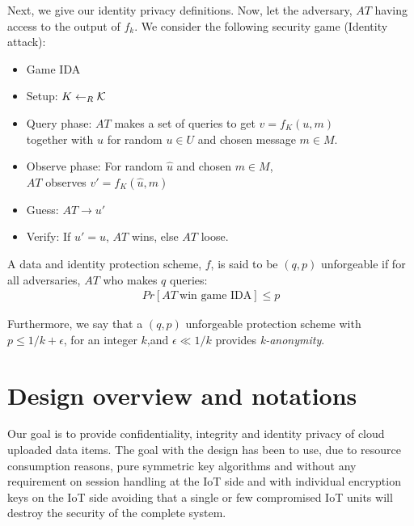 {\begin{definition}
\end{definition}
Next, we give our identity privacy definitions. Now, let the adversary, $AT$ having access to the output of $f_{k}$. We consider the following security game (Identity attack):
\begin{itemize}
    \item[] Game IDA \\
    \item Setup: $K \leftarrow_R \cal{K}$
    \item Query phase: $AT$ makes a set of queries to get $v = f_K(u,m)$ \\ together with $u$ for random $u \in U$ and chosen message $m \in M$.
    \item Observe phase: For random $\hat{u}$ and chosen $m \in M$, \\ $AT$ observes  $v' = f_K(\hat{u},m)$
    \item Guess: $AT \rightarrow u'$
    \item Verify: If $u' =  \hat{u}$, $AT$ wins, else $AT$ loose.
\end{itemize}
\begin{definition}
\label{idprivacy}
A data and identity protection scheme, $f$, is said to be $(q,p)$ unforgeable if for all adversaries, $AT$ who makes $q$ queries: 
\begin{eqnarray}
     Pr[AT\: \text{win  game IDA}] \leq p \label{req:privacy}
\end{eqnarray}
\end{definition}
Furthermore, we say that a $(q,p)$ unforgeable protection scheme with $p \leq 1/k + \epsilon$, for an integer $k$,and $\epsilon \ll 1/k$ provides \textit{k-anonymity}. 

\graphicspath{{DesignOverview/images/}}
\section{Design overview and notations}
\label{design}
Our goal is to provide confidentiality, integrity and identity privacy of cloud uploaded data items. The goal with the design has been to use, due to resource consumption reasons, pure symmetric key algorithms and without any requirement on session handling at the IoT side and with individual encryption keys on the IoT side avoiding that a single or few compromised IoT units will destroy the security of the complete system.

}
